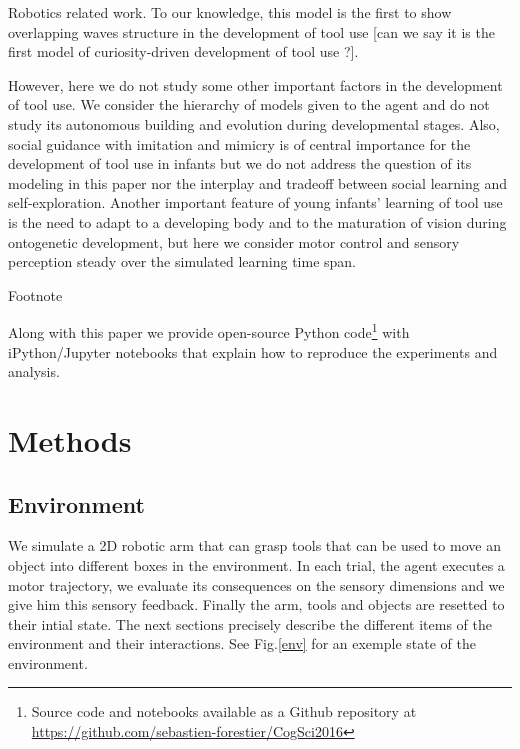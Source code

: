 \documentclass[10pt,letterpaper]{article}
\begin{document}
	Robotics related work.
	\cite{ugur2015}
	To our knowledge, this model is the first to show overlapping waves structure in the development of tool use [can we say it is the first model of curiosity-driven development of tool use ?].
	
	However, here we do not study some other important factors in the development of tool use.
	We consider the hierarchy of models given to the agent and do not study its autonomous building and evolution during developmental stages.
	Also, social guidance with imitation and mimicry is of central importance for the development of tool use in infants but we do not address the question
	of its modeling in this paper nor the interplay and tradeoff between social learning and self-exploration.
	Another important feature of young infants' learning of tool use is the need to adapt to a developing body and to the maturation of vision during ontogenetic development, 
	but here we consider motor control and sensory perception steady over the simulated learning time span.
	
	Footnote
	\cite{forestier2015}
	\cite{unifying}

	Along with this paper we provide open-source Python code\footnote{Source code and notebooks available as a Github repository at \url{https://github.com/sebastien-forestier/CogSci2016}} 
	with iPython/Jupyter notebooks that explain how to reproduce the experiments and analysis. 
	
	
%

\section{Methods}

	\subsection{Environment}
	
		We simulate a 2D robotic arm that can grasp tools that can be used to move an object into different boxes in the environment. 		
		In each trial, the agent executes a motor trajectory, we evaluate its consequences on the sensory dimensions and we give him
		this sensory feedback. Finally the arm, tools and objects are resetted to their intial state.
		The next sections precisely describe the different items of the environment and their interactions.	
		See Fig.\ref{env} for an exemple state of the environment. 
		
\end{document}
